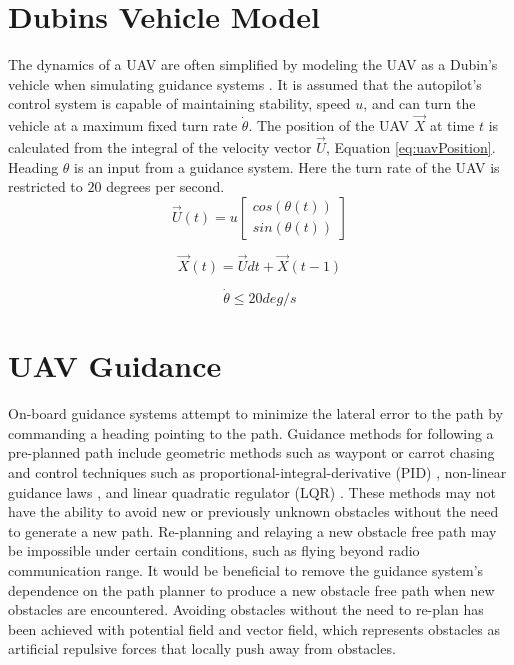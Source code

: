 \documentclass[numbered,pdftex]{ohio-etd}
\begin{document}
\section{Dubins Vehicle Model}
The dynamics of a UAV are often simplified by modeling the UAV as a Dubin's vehicle when simulating guidance systems \cite{frew_cooperative_2007,griffiths_vector_2006,nelson_cooperative_2005,nelson_vector_2006,nelson_vector_2007}. It is assumed that the autopilot's control system is capable of maintaining stability, speed $u$, and can turn the vehicle at a maximum fixed turn rate $\dot{\theta}$. The position of the UAV $\overrightarrow{X}$ at time $t$ is calculated from the integral of the velocity vector $\overrightarrow{U}$, Equation \ref{eq:uavPosition}. Heading $\theta$ is an input from a guidance system. Here the turn rate of the UAV is restricted to $20$ degrees per second.
\begin{equation}
\label{eq:uavVelocity}
\overrightarrow{U}(t) = u \begin{bmatrix}
cos(\theta(t)) \\
sin(\theta(t))
\end{bmatrix}
\end{equation}


\begin{equation}
\label{eq:uavPosition}
\overrightarrow{X}(t) = \overrightarrow{U}dt + \overrightarrow{X}(t-1)
\end{equation}


\begin{equation}
\label{turnRate}
\dot{\theta} \leq 20 deg/s
\end{equation}


\section{UAV Guidance}
On-board guidance systems attempt to minimize the lateral error to the path by commanding a heading pointing to the path. Guidance methods for following a pre-planned path include geometric methods such as waypont \cite{osborne_waypoint_2005} or carrot chasing \cite{manjunath_application_2016} and control techniques such as proportional-integral-derivative (PID) \cite{rhee2010tight}, non-linear guidance laws \cite{park2007performance}, and linear quadratic regulator (LQR) \cite{ratnoo_adaptive_2011}. These methods may not have the ability to avoid new or previously unknown obstacles without the need to generate a new path. Re-planning and relaying a new obstacle free path may be impossible under certain conditions, such as flying beyond radio communication range. It would be beneficial to remove the guidance system's dependence on the path planner to produce a new obstacle free path when new obstacles are encountered. Avoiding obstacles without the need to re-plan has been achieved with potential field and vector field, which represents obstacles as artificial repulsive forces that locally push away from obstacles. 
\end{document}
